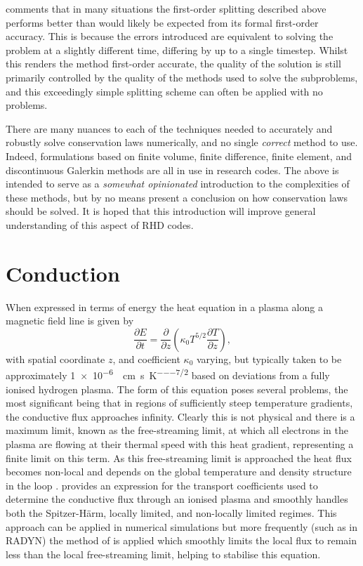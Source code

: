 \citet{LeVeque1997} comments that in many situations the first-order splitting described above performs better than would likely be expected from its formal first-order accuracy.
This is because the errors introduced are equivalent to solving the problem at a slightly different time, differing by up to a single timestep.
Whilst this renders the method first-order accurate, the quality of the solution is still primarily controlled by the quality of the methods used to solve the subproblems, and this exceedingly simple splitting scheme can often be applied with no problems.

There are many nuances to each of the techniques needed to accurately and robustly solve conservation laws numerically, and no single \emph{correct} method to use.
Indeed, formulations based on finite volume, finite difference, finite element, and discontinuous Galerkin methods are all in use in \Sota{} research codes.
The above is intended to serve as a \emph{somewhat opinionated} introduction to the complexities of these methods, but by no means present a conclusion on how conservation laws should be solved.
It is hoped that this introduction will improve general understanding of this aspect of RHD codes.

\section{Conduction}\label{Sec:NumericalConduction}

When expressed in terms of energy the heat equation in a plasma along a magnetic field line is given by
\begin{equation}
    \frac{\partial E}{\partial t} = \frac{\partial}{\partial z}\left( \kappa_0 T^{5/2} \frac{\partial T}{\partial z} \right),
\end{equation}
with spatial coordinate $z$, and coefficient $\kappa_0$ varying, but typically taken to be approximately \SI{1e-6}{\erg\per\centi\metre\per\second\per\kelvin\tothe{7/2}} \citep{Spitzer1953,Braginskii1965} based on deviations from a fully ionised hydrogen plasma.
The form of this equation poses several problems, the most significant being that in regions of sufficiently steep temperature gradients, the conductive flux approaches infinity.
Clearly this is not physical and there is a maximum limit, known as the free-streaming limit, at which all electrons in the plasma are flowing at their thermal speed with this heat gradient, representing a finite limit on this term.
As this free-streaming limit is approached the heat flux becomes non-local and depends on the global temperature and density structure in the loop \citep{Battaglia2009}.
\citet{Campbell1984} provides an expression for the transport coefficients used to determine the conductive flux through an ionised plasma and smoothly handles both the Spitzer-H\"{a}rm, locally limited, and non-locally limited regimes.
This approach can be applied in numerical simulations but more frequently (such as in RADYN) the method of \citet{FISHER1985} is applied which smoothly limits the local flux to remain less than the local free-streaming limit, helping to stabilise this equation.

